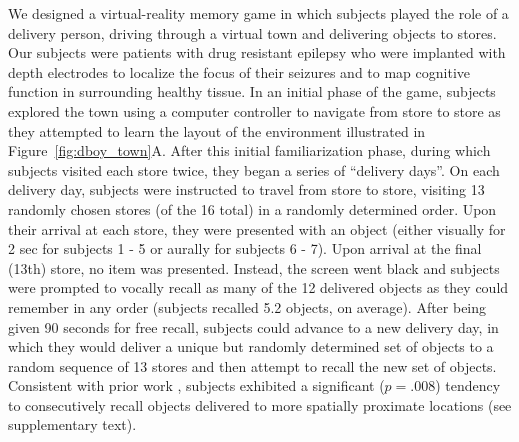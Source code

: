 We designed a virtual-reality memory game in which subjects played the role of a delivery person, driving through a virtual town and delivering objects to stores.  Our subjects were patients with drug resistant epilepsy who were implanted with depth electrodes to localize the focus of their seizures and to map cognitive function in surrounding healthy tissue. In an initial phase of the game, subjects explored the town using a computer controller to navigate from store to store as they attempted to learn the layout of the environment illustrated in Figure~\ref{fig:dboy_town}A.  After this initial familiarization phase, during which subjects visited each store twice, they began a series of ``delivery days''.  On each delivery day, subjects were instructed to travel from store to store, visiting 13 randomly chosen stores (of the 16 total) in a randomly determined order.  Upon their arrival at each store, they were presented with an object (either visually for 2 sec for subjects 1 - 5 or aurally for subjects 6 - 7).  Upon arrival at the final (13th) store, no item was presented. Instead, the screen went black and subjects were prompted to vocally recall as many of the 12 delivered objects as they could remember in any order (subjects recalled 5.2 objects, on average).  After being given 90 seconds for free recall, subjects could advance to a new delivery day, in which they would deliver a unique but randomly determined set of objects to a random sequence of 13 stores and then attempt to recall the new set of objects. Consistent with prior work \cite{MillEtal12a}, subjects exhibited a significant ($p=.008$) tendency to consecutively recall objects delivered to more spatially proximate locations (see supplementary  text).


